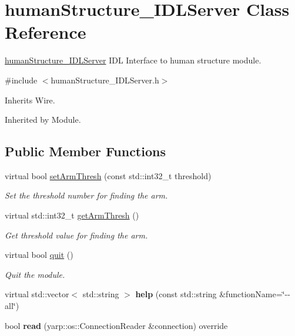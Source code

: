 \section{human\+Structure\+\_\+\+I\+D\+L\+Server Class Reference}
\label{classhumanStructure__IDLServer}


\hyperlink{classhumanStructure__IDLServer}{human\+Structure\+\_\+\+I\+D\+L\+Server} I\+DL Interface to human structure module.  




{\ttfamily \#include $<$human\+Structure\+\_\+\+I\+D\+L\+Server.\+h$>$}



Inherits Wire.



Inherited by Module.

\subsection*{Public Member Functions}
\begin{DoxyCompactItemize}
\item 
virtual bool \hyperlink{classhumanStructure__IDLServer_aaae9e95ab2098cd58c97eadeb21f509d}{set\+Arm\+Thresh} (const std\+::int32\+\_\+t threshold)
\begin{DoxyCompactList}\small\item\em Set the threshold number for finding the arm. \end{DoxyCompactList}\item 
virtual std\+::int32\+\_\+t \hyperlink{classhumanStructure__IDLServer_ad369af528fab47cf8ae4f14c0ab5e0ce}{get\+Arm\+Thresh} ()
\begin{DoxyCompactList}\small\item\em Get threshold value for finding the arm. \end{DoxyCompactList}\item 
virtual bool \hyperlink{classhumanStructure__IDLServer_a3573f22d04a104ee0052bb162190845f}{quit} ()
\begin{DoxyCompactList}\small\item\em Quit the module. \end{DoxyCompactList}\item 
\mbox{\label{classhumanStructure__IDLServer_afa87b42d8d1963def5d490c6110a70e7}} 
virtual std\+::vector$<$ std\+::string $>$ {\bfseries help} (const std\+::string \&function\+Name=\char`\"{}-\/-\/all\char`\"{})
\item 
\mbox{\label{classhumanStructure__IDLServer_a11d874f87cfe2baeb2a6008acf51b024}} 
bool {\bfseries read} (yarp\+::os\+::\+Connection\+Reader \&connection) override
\end{DoxyCompactItemize}


